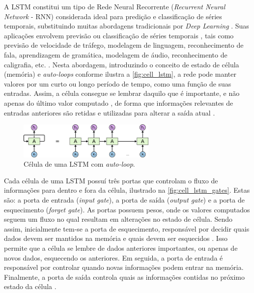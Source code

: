 A LSTM constitui um tipo de Rede Neural Recorrente (\textit{Recurrent Neural Network} - RNN) considerada ideal para predição e classificação de séries temporais, substituindo muitas abordagens tradicionais por \textit{Deep Learning} \cite{Zaccone2017}. Suas aplicações envolvem previsão ou classificação de séries temporais \cite{Zaccone2017}, tais como previsão de velocidade de tráfego, modelagem de linguagem, reconhecimento de fala, aprendizagem de gramática, modelagem de áudio, reconhecimento de caligrafia, etc. \cite{Bianchi2017}. Nesta abordagem, introduzindo o conceito de estado de célula (memória) e \textit{auto-loops} conforme ilustra a \autoref{fig:cell_lstm}, a rede pode manter valores por um curto ou longo período de tempo, como uma função de suas entradas. Assim, a célula consegue se lembrar daquilo que é importante, e não apenas do último valor computado \cite{Jones2017}, de forma que informações relevantes de entradas anteriores são retidas e utilizadas para alterar a saída atual \cite{Zebin2018}.

\begin{figure}[h]
  \centering
  \caption{Célula de uma LSTM com \textit{auto-loop}.}
   \label{fig:cell_lstm}
   \includegraphics[width=0.6\textwidth]{figuras/fig_8.png}
\end{figure}

Cada célula de uma LSTM possuí três portas que controlam o fluxo de informações para dentro e fora da célula, ilustrado na \autoref{fig:cell_lstm_gates}. Estas são: a porta de entrada (\textit{input gate}), a porta de saída (\textit{output gate}) e a porta de esquecimento (\textit{forget gate}). As portas possuem pesos, onde os valores computados seguem um fluxo no qual resultam em alterações no estado de célula. Sendo assim, inicialmente tem-se a porta de esquecimento, responsável por decidir quais dados devem ser mantidos na memória e quais devem ser esquecidos \cite{Phi2020}. Isso permite que a célula se lembre de dados anteriores importantes, ou apenas de novos dados, esquecendo os anteriores. Em seguida, a porta de entrada é responsável por controlar quando novas informações podem entrar na memória. Finalmente, a porta de saída controla quais as informações contidas no próximo estado da célula \cite{Jones2017}.

